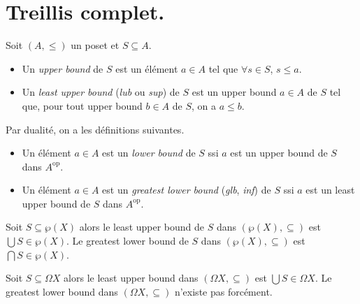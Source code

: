 \documentclass[./main]{subfiles}
\begin{document}
  \section{Treillis complet.}

  \begin{defn}
    Soit $(A, {\le})$ un poset et $S \subseteq A$.
    \begin{itemize}
      \item Un \textit{upper bound} de $S$ est un élément $a \in A$ tel que $\forall s \in S$, $s \le a$.
      \item Un \textit{least upper bound} (\textit{lub} ou \textit{sup}) de $S$ est un upper bound $a \in A$ de $S$ tel que, pour tout upper bound $b \in A$ de $S$, on a $a \le b$.
    \end{itemize}

    Par dualité, on a les définitions suivantes.
    \begin{itemize}
      \item Un élément $a \in A$ est un \textit{lower bound} de $S$ ssi $a$ est un upper bound de $S$ dans $A^\mathrm{op}$.
      \item Un élément $a \in A$ est un \textit{greatest lower bound} (\textit{glb}, \textit{inf}) de $S$ ssi $a$ est un least upper bound de $S$ dans $A^\mathrm{op}$.
    \end{itemize}
  \end{defn}

  \begin{exm}
    Soit $S \subseteq \wp(X)$ alors le least upper bound de $S$ dans $(\wp(X), \subseteq)$ est $\bigcup S \in \wp(X)$.
    Le greatest lower bound de $S$ dans $(\wp(X), \subseteq)$ est $\bigcap S \in \wp(X)$.
  \end{exm}

  \begin{exm}
    Soit $S \subseteq \Omega X$ alors le least upper bound dans ${(\Omega X, \subseteq)}$ est $\bigcup S \in \Omega X$.
    Le greatest lower bound dans $(\Omega X, \subseteq)$ n'existe pas forcément.
  \end{exm}

  \begin{exm}
    
  \end{exm}
\end{document}
